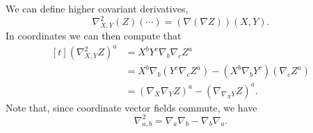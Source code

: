 \documentclass[titlepage,numbers=noenddot,headinclude,oneside,%
footinclude=true,cleardoublepage=empty,%
BCOR=5mm,paper=a4,fontsize=11pt,%
english,%
]{scrartcl}
\begin{document}
\begin{remark}
    We can define higher covariant derivatives, \eg
    \begin{equation*}
        \nabla^2_{X,Y}(Z)(\cdots)=(\nabla(\nabla Z))(X,Y).
    \end{equation*}
    In coordinates we can then compute that
    \begin{equation*}
        \begin{aligned}[t]
            (\nabla^2_{X,Y}Z)^a&=X^b Y^c \nabla_b\nabla_c Z^a\\
            &=X^b \nabla_b (Y^c \nabla_c Z^a)-(X^b \nabla_b Y^c)(\nabla_c Z^a)\\
            &=(\nabla_X \nabla_Y Z)^a-(\nabla_{\nabla_X Y}Z)^a.
        \end{aligned}
    \end{equation*}
    Note that, since coordinate vector fields commute, we have
    \begin{equation*}
        \nabla^2_{a,b}=\nabla_a \nabla_b-\nabla_b \nabla_a.
    \end{equation*}
\end{remark}
\end{document}
